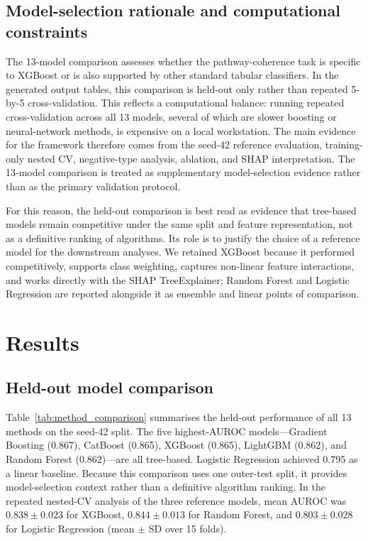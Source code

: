 \documentclass[12pt,letterpaper,oneside,openany]{book}
\begin{document}
\section{Model-selection rationale and computational constraints}
\label{sec:methods_model_rationale}

The 13-model comparison assesses whether the pathway-coherence task is specific to XGBoost or is also supported by other standard tabular classifiers. In the generated output tables, this comparison is held-out only rather than repeated 5-by-5 cross-validation. This reflects a computational balance: running repeated cross-validation across all 13 models, several of which are slower boosting or neural-network methods, is expensive on a local workstation. The main evidence for the framework therefore comes from the seed-42 reference evaluation, training-only nested CV, negative-type analysis, ablation, and SHAP interpretation. The 13-model comparison is treated as supplementary model-selection evidence rather than as the primary validation protocol.

For this reason, the held-out comparison is best read as evidence that tree-based models remain competitive under the same split and feature representation, not as a definitive ranking of algorithms. Its role is to justify the choice of a reference model for the downstream analyses. We retained XGBoost because it performed competitively, supports class weighting, captures non-linear feature interactions, and works directly with the SHAP TreeExplainer; Random Forest and Logistic Regression are reported alongside it as ensemble and linear points of comparison.


\chapter{Results}
\label{sec:results}

\section{Held-out model comparison}
\label{sec:res_model_comparison}

Table~\ref{tab:method_comparison} summarises the held-out performance of all 13 methods on the seed-42 split. The five highest-AUROC models---Gradient Boosting (0.867), CatBoost (0.865), XGBoost (0.865), LightGBM (0.862), and Random Forest (0.862)---are all tree-based. Logistic Regression achieved 0.795 as a linear baseline. Because this comparison uses one outer-test split, it provides model-selection context rather than a definitive algorithm ranking. In the repeated nested-CV analysis of the three reference models, mean AUROC was $0.838 \pm 0.023$ for XGBoost, $0.844 \pm 0.013$ for Random Forest, and $0.803 \pm 0.028$ for Logistic Regression (mean $\pm$ SD over 15 folds).
\end{document}
